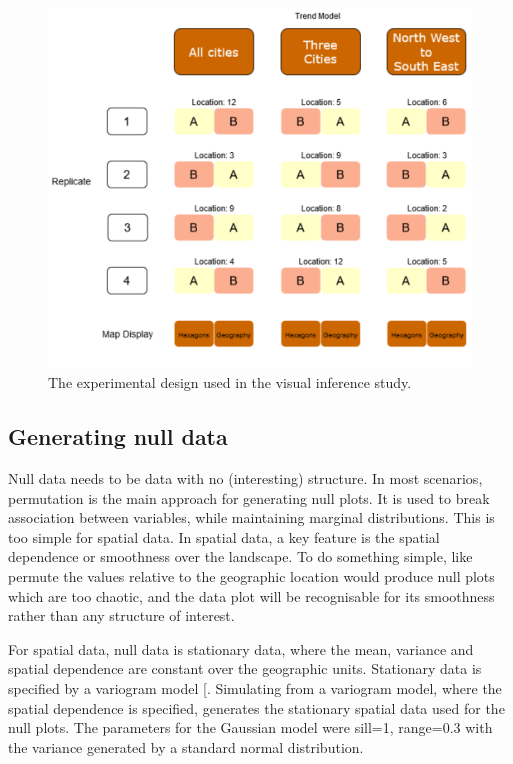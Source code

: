 \documentclass[
]{article}
\begin{document}
\begin{figure}
\includegraphics[width=1\linewidth]{paper_files/figure-latex/exp-design-1} \caption{The experimental design used in the visual inference study.}\label{fig:exp-design}
\end{figure}

\subsection{Generating null data}\label{generating-null-data}

Null data needs to be data with no (interesting) structure. In most
scenarios, permutation is the main approach for generating null plots.
It is used to break association between variables, while maintaining
marginal distributions. This is too simple for spatial data. In spatial
data, a key feature is the spatial dependence or smoothness over the
landscape. To do something simple, like permute the values relative to
the geographic location would produce null plots which are too chaotic,
and the data plot will be recognisable for its smoothness rather than
any structure of interest.

For spatial data, null data is stationary data, where the mean, variance
and spatial dependence are constant over the geographic units.
Stationary data is specified by a variogram model
{[}\citeproc{ref-POG}{16}{]}. Simulating from a variogram model, where
the spatial dependence is specified, generates the stationary spatial
data used for the null plots. The parameters for the Gaussian model were
sill=1, range=0.3 with the variance generated by a standard normal
distribution.
\end{document}
